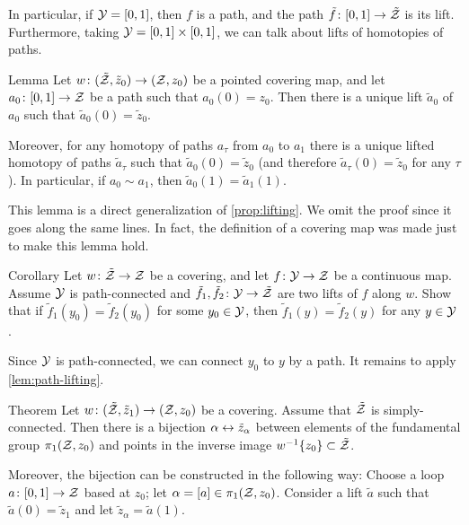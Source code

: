 In particular, if $\mathcal{Y}=[0,1]$, then $f$ is a path, and the path $\tilde f\:[0,1]\z\to \tilde{\c{Z}}$ is its lift.
Furthermore, taking $\mathcal{Y}=[0,1]\times [0,1]$, we can talk about lifts of homotopies of paths.

\begin{thm}{Lemma}\label{lem:path-lifting}
Let $w\colon(\tilde{\mathcal{Z}},\tilde z_0)\to (\mathcal{Z},z_0)$ be a pointed covering map, and let $a_0\:[0,1]\z\to \c{Z}$ be a path such that $a_0(0)=z_0$.
Then there is a unique lift $\tilde a_0$ of $a_0$ such that $\tilde a_0(0)=\tilde z_0$.

Moreover, for any homotopy of paths $a_\tau$ from $a_0$ to $a_1$ there is a unique lifted homotopy of paths $\tilde a_\tau$ such that $\tilde a_0(0)=\tilde z_0$ (and therefore $\tilde a_\tau(0)=\tilde z_0$ for any $\tau$).
In particular, if $a_0\sim a_1$, then $\tilde a_0(1)= \tilde a_1(1)$.
\end{thm}

This lemma is a direct generalization of \ref{prop:lifting}.
We omit the proof since it goes along the same lines.
In fact, the definition of a covering map was made just to make this lemma hold.

\begin{thm}{Corollary}\label{ex:unique-lift}
Let $w\colon\tilde{\mathcal{Z}}\to \mathcal{Z}$ be a covering, and let $f\colon\mathcal{Y}\to \mathcal{Z}$ be a continuous map.
Assume $\mathcal{Y}$ is path-connected and $\tilde f_1,\tilde f_2\colon\mathcal{Y}\to \tilde{\mathcal{Z}}$ are two lifts of $f$ along $w$.
Show that if $\tilde f_1(y_0)=\tilde f_2(y_0)$ for some $y_0\in \mathcal{Y}$, then $\tilde f_1(y)=\tilde f_2(y)$ for any $y\in \mathcal{Y}$.
\end{thm}

Since $\mathcal{Y}$ is path-connected, we can connect $y_0$ to $y$ by a path.
It remains to apply \ref{lem:path-lifting}.
\qeds


\begin{thm}{Theorem}\label{thm:bijection-fiber}
Let $w\colon (\tilde{\mathcal{Z}},\tilde z_1)\to (\mathcal{Z}, z_0)$ be a covering.
Assume that $\tilde{\mathcal{Z}}$ is simply-connected.
Then there is a bijection $\alpha\z\leftrightarrow \tilde z_\alpha$ between elements of the fundamental group $\pi_1(\mathcal{Z},z_0)$ and points in the inverse image $w^{-1}\{z_0\}\subset \tilde{\mathcal{Z}}$.

Moreover, the bijection can be constructed in the following way:
Choose a loop $a\:[0,1]\z\to\c{Z}$ based at $z_0$;
let $\alpha\z=[a]\in \pi_1(\c{Z},z_0)$.
Consider a lift $\tilde a$ such that $\tilde a(0)=\tilde z_1$ and let $\tilde z_\alpha= \tilde a(1)$.
\end{thm}

